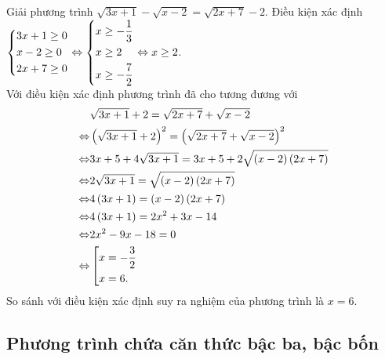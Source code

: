 \begin{bt}%
	Giải phương trình $\sqrt{3x + 1} - \sqrt{x - 2} = \sqrt{2x + 7} - 2$.
	\loigiai
	{
		Điều kiện xác định  $\left\{\begin{aligned}&3x + 1\geq 0\\&x - 2\geq 0\\&2x + 7\geq 0\end{aligned}\right.\Leftrightarrow \left\{\begin{aligned}&x\geq - \dfrac{1}{3}\\&x\geq 2\\&x\geq - \dfrac{7}{2}\end{aligned}\right.\Leftrightarrow x\geq 2$.\\
		Với điều kiện xác định phương trình đã cho tương đương với
		\begin{align*}
		& \sqrt{3x + 1} +  2 = \sqrt{2x + 7} + \sqrt{x - 2}\\
		\Leftrightarrow & \left(\sqrt{3x + 1} +  2\right)^2 = \left(\sqrt{2x + 7} + \sqrt{x - 2}\right)^2\\
		\Leftrightarrow & 3x + 5 + 4\sqrt{3x + 1}  = 3x + 5 + 2\sqrt{\left(x - 2\right)\left(2x + 7\right)}\\
		\Leftrightarrow & 2\sqrt{3x + 1}  = \sqrt{\left(x - 2\right)\left(2x + 7\right)}\\
		\Leftrightarrow & 4\left(3x + 1\right)  =  \left(x - 2\right)\left(2x + 7\right)\\
		\Leftrightarrow & 4\left(3x + 1\right)  =  2x^2 + 3x - 14\\
		\Leftrightarrow & 2x^2  - 9x - 18 = 0\\
		\Leftrightarrow & \left[\begin{aligned}&x = - \dfrac{3}{2}\\&x = 6.\end{aligned}\right.\\
		\end{align*}
		So sánh với điều kiện xác định suy ra nghiệm của phương trình là $x = 6$. 
	}
\end{bt}

\subsection{Phương trình chứa căn thức bậc ba, bậc bốn}

